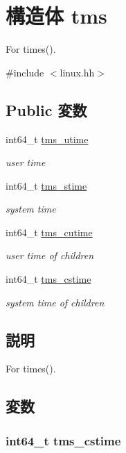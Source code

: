 \hypertarget{structArmLinux64_1_1tms}{
\section{構造体 tms}
\label{structArmLinux64_1_1tms}
}


For times().  


{\ttfamily \#include $<$linux.hh$>$}\subsection*{Public 変数}
\begin{DoxyCompactItemize}
\item 
int64\_\-t \hyperlink{structArmLinux64_1_1tms_ab04ac3ffd1b9aab37d4a7857e0ffcdb8}{tms\_\-utime}
\begin{DoxyCompactList}\small\item\em user time \item\end{DoxyCompactList}\item 
int64\_\-t \hyperlink{structArmLinux64_1_1tms_a35539e36d7debbc4664f2470764bbad0}{tms\_\-stime}
\begin{DoxyCompactList}\small\item\em system time \item\end{DoxyCompactList}\item 
int64\_\-t \hyperlink{structArmLinux64_1_1tms_a6da7d6e7d686aa5a9bf91b8bf6c4139f}{tms\_\-cutime}
\begin{DoxyCompactList}\small\item\em user time of children \item\end{DoxyCompactList}\item 
int64\_\-t \hyperlink{structArmLinux64_1_1tms_ad28846c008175f5be865cdfc14721139}{tms\_\-cstime}
\begin{DoxyCompactList}\small\item\em system time of children \item\end{DoxyCompactList}\end{DoxyCompactItemize}


\subsection{説明}
For times(). 

\subsection{変数}
\hypertarget{structArmLinux64_1_1tms_ad28846c008175f5be865cdfc14721139}{
\subsubsection[{tms\_\-cstime}]{\setlength{\rightskip}{0pt plus 5cm}int64\_\-t {\bf tms\_\-cstime}}}
\label{structArmLinux64_1_1tms_ad28846c008175f5be865cdfc14721139}


